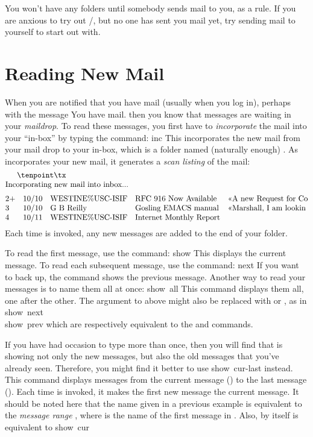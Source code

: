 You won't have any folders until somebody sends mail to you, as a rule.
If you are anxious to try out \MH/, but no one has sent you mail yet,
try sending mail to yourself to start out with.

\section{Reading New Mail}
When you are notified that you have mail (usually when you log in),
perhaps with the message
\example You have mail.\endexample
then you know that messages are waiting in your {\it maildrop}.
To read these messages, you first have to {\it incorporate} the mail
into your ``in-box'' by typing the command:
\example inc\endexample
This incorporates the new mail from your mail drop to your in-box,
which is a folder named (naturally enough) .
As  incorporates your new mail,
it generates a {\it scan listing} of the mail:
$$\vbox{\tenpoint\tx\halign{\hfil#&#\hfil&&	\quad#\hfil\cr
\noalign{\noindent Incorporating new mail into inbox...\medskip}
2&+&	10/10&	WESTINE\%USC-ISIF&	RFC 916 Now Available&
					<<A new Request for Co\cr
3&&	10/10&	G B Reilly&		Gosling EMACS manual&
					<<Marshall, I am lookin\cr
4&&	10/11&	WESTINE\%USC-ISIF&	Internet Monthly Report&\cr
}}$$
Each time  is invoked,
any new messages are added to the end of your  folder.

To read the first message,
use the  command:
\example show\endexample
This displays the current message.
To read each subsequent message,
use the  command:
\example next\endexample
If you want to back up,
the command  shows the previous message.
Another way to read your messages is to name them all at once:
\example show\ all\endexample
This command displays them all, one after the other.
The  argument to  above might also be replaced
with  or , as in
\example
    show\ next\\
    show\ prev
\endexample
which are respectively equivalent to the  and 
commands.

If you have had occasion to type  more than once, then
you will find that  is showing not only the new messages,
but also the old messages that you've already seen.
Therefore, you might find it better to use
\example show\ cur-last\endexample
instead.
This command displays messages from the current message ()
to the last message ().
Each time  is invoked, it makes the first new message
the current message.
It should be noted here that the name  given in a previous
example is equivalent to the {\it message range} ,
where  is the name of the first message in .
Also,  by itself is equivalent to
\example show\ cur\endexample

